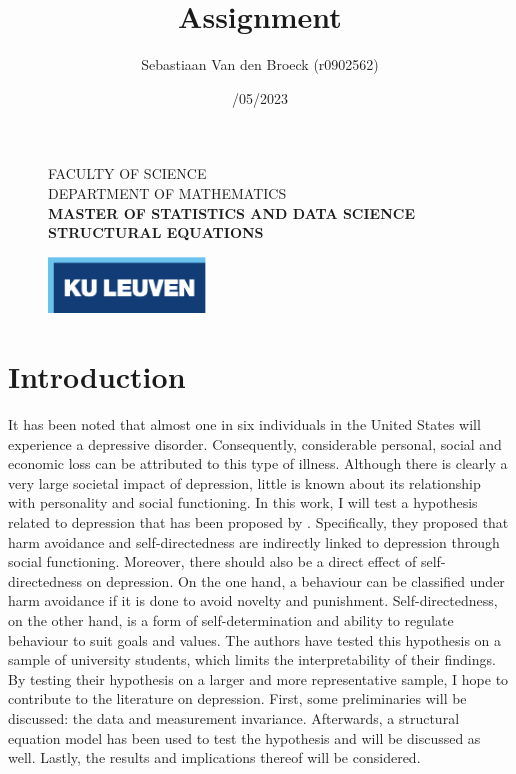 \documentclass[11pt]{article}
\title{\vspace*{40.0mm}
  \bf\sf Assignment
         \vspace*{20.0mm} \\
  \vspace*{40.0mm}}
\author{\sf Sebastiaan Van den Broeck (r0902562)}
\date{\sf 28/05/2023}
\begin{document}
\begin{figure}
  \parbox[t]{125mm}{
    \vspace*{6mm}
    \scriptsize\sf           FACULTY OF SCIENCE \\
    \scriptsize\sf           DEPARTMENT OF MATHEMATICS \\
    \scriptsize\sf\bfseries  MASTER OF STATISTICS AND DATA SCIENCE \\
    \scriptsize\sf\bfseries  STRUCTURAL EQUATIONS \\}
  \parbox[t]{40mm}{
    \begin{flushright}
      \includegraphics[height=15mm]{logo.eps.pdf}
    \end{flushright}}
\end{figure}

\maketitle
\thispagestyle{empty}
\raggedbottom

\cleardoublepage
\setcounter{page}{1}
\setcounter{tocdepth}{3}

\tableofcontents
\listoffigures
\listoftables

\pagebreak\section{Introduction}

It has been noted that almost one in six individuals in the United States will
experience a depressive disorder. Consequently, considerable personal, social
and economic loss can be attributed to this type of illness. Although there is
clearly a very large societal impact of depression, little is known about its
relationship with personality and social functioning. In this work, I will test
a hypothesis related to depression that has been proposed by \textcite{tse2011}.
Specifically, they proposed that harm avoidance and self-directedness are
indirectly linked to depression through social functioning. Moreover, there
should also be a direct effect of self-directedness on depression. On the one
hand, a behaviour can be classified under harm avoidance if it is done to avoid
novelty and punishment. Self-directedness, on the other hand, is a form of
self-determination and ability to regulate behaviour to suit goals and values.
The authors have tested this hypothesis on a sample of university students,
which limits the interpretability of their findings. By testing their hypothesis
on a larger and more representative sample, I hope to contribute to the
literature on depression. First, some preliminaries will be discussed: the data
and measurement invariance. Afterwards, a structural equation model has been
used to test the hypothesis and will be discussed as well. Lastly, the results
and implications thereof will be considered.
\end{document}
